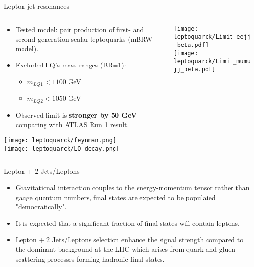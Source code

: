 \documentclass[8pt]{beamer}
\begin{document}
\begin{frame}{\large Lepton-jet resonances}

  \begin{columns}
   \begin{column}{7.5cm}
    \begin{itemize}
      \item Tested model: pair production of first- and second-generation scalar leptoquarks (mBRW model).
      \vspace{0.15cm}
      \item Excluded LQ’s mass ranges (BR=1):
      \begin{itemize}
       \item $m_{LQ1} < 1100$ GeV
       \item $m_{LQ2} < 1050$ GeV
      \end{itemize}
      \vspace{0.15cm}
      \item Observed limit is \textbf{stronger by 50 GeV} comparing with ATLAS Run 1 result. 
    \end{itemize}
    \vspace{0.05cm}
    {\centering
      \texttt{[image: leptoquarck/feynman.png]}\\
      \texttt{[image: leptoquarck/LQ\_decay.png]}\\
    }

   \end{column}
   \begin{column}{4.5cm}
    \texttt{[image: leptoquarck/Limit\_eejj\_beta.pdf]}\\
    \texttt{[image: leptoquarck/Limit\_mumujj\_beta.pdf]}\\
   \end{column}
  \end{columns}
\end{frame}
\begin{frame}{\large Lepton + 2 Jets/Leptons}


\begin{itemize}
 \item Gravitational interaction couples to the energy-momentum tensor rather than gauge
quantum numbers, final states are expected to be populated "democratically".
 \item It is expected that a significant fraction of final states will contain leptons.
 \item Lepton + 2 Jets/Leptons selection enhance the signal strength compared
to the dominant background at the LHC which arises from quark and gluon scattering processes forming
hadronic final states.
\end{itemize}

\end{frame}
\end{document}
